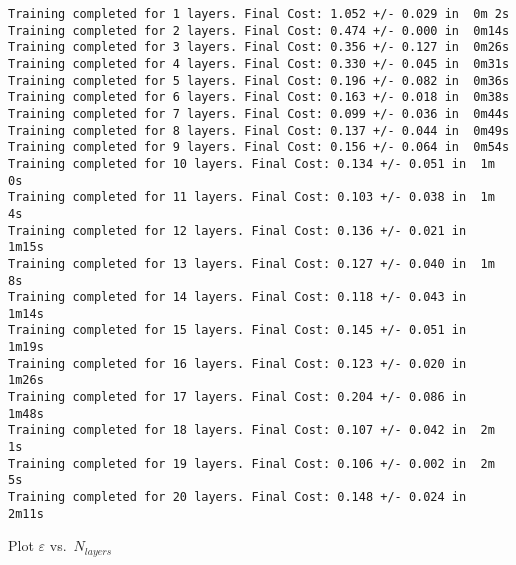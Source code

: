\documentclass[11pt]{article}
\begin{document}
    \begin{Verbatim}[commandchars=\\\{\}]
Training completed for 1 layers. Final Cost: 1.052 +/- 0.029 in  0m 2s
Training completed for 2 layers. Final Cost: 0.474 +/- 0.000 in  0m14s
Training completed for 3 layers. Final Cost: 0.356 +/- 0.127 in  0m26s
Training completed for 4 layers. Final Cost: 0.330 +/- 0.045 in  0m31s
Training completed for 5 layers. Final Cost: 0.196 +/- 0.082 in  0m36s
Training completed for 6 layers. Final Cost: 0.163 +/- 0.018 in  0m38s
Training completed for 7 layers. Final Cost: 0.099 +/- 0.036 in  0m44s
Training completed for 8 layers. Final Cost: 0.137 +/- 0.044 in  0m49s
Training completed for 9 layers. Final Cost: 0.156 +/- 0.064 in  0m54s
Training completed for 10 layers. Final Cost: 0.134 +/- 0.051 in  1m 0s
Training completed for 11 layers. Final Cost: 0.103 +/- 0.038 in  1m 4s
Training completed for 12 layers. Final Cost: 0.136 +/- 0.021 in  1m15s
Training completed for 13 layers. Final Cost: 0.127 +/- 0.040 in  1m 8s
Training completed for 14 layers. Final Cost: 0.118 +/- 0.043 in  1m14s
Training completed for 15 layers. Final Cost: 0.145 +/- 0.051 in  1m19s
Training completed for 16 layers. Final Cost: 0.123 +/- 0.020 in  1m26s
Training completed for 17 layers. Final Cost: 0.204 +/- 0.086 in  1m48s
Training completed for 18 layers. Final Cost: 0.107 +/- 0.042 in  2m 1s
Training completed for 19 layers. Final Cost: 0.106 +/- 0.002 in  2m 5s
Training completed for 20 layers. Final Cost: 0.148 +/- 0.024 in  2m11s
    \end{Verbatim}

    Plot \(\varepsilon\) vs.~\(N_{layers}\)
\end{document}

